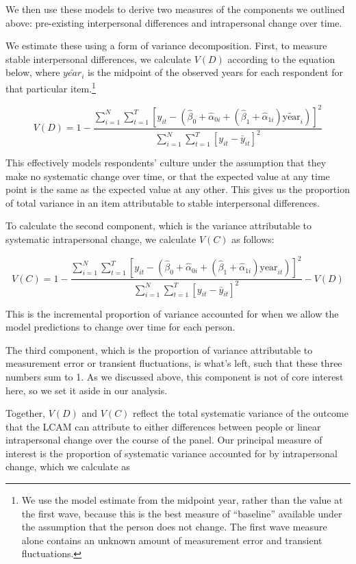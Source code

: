 \documentclass[
  11pt,
]{article}
\begin{document}
We then use these models to derive two measures of the components we
outlined above: pre-existing interpersonal differences and intrapersonal
change over time.

We estimate these using a form of variance decomposition. First, to
measure stable interpersonal differences, we calculate \(V(D)\)
according to the equation below, where \(\widetilde{year_i}\) is the
midpoint of the observed years for each respondent for that particular
item.\footnote{We use the model estimate from the midpoint year, rather
  than the value at the first wave, because this is the best measure of
  ``baseline'' available under the assumption that the person does not
  change. The first wave measure alone contains an unknown amount of
  measurement error and transient fluctuations.}

\[
V(D) = 1 - \frac{\sum_{i=1}^N \sum_{t=1}^T [y_{it} - (\hat{\beta}_0 + \hat{\alpha}_{0i} + (\hat{\beta}_1 + \hat{\alpha}_{1i}) \widetilde{\text{year}}_{i})]^2}{\sum_{i=1}^N \sum_{t=1}^T [y_{it} - \bar{y}_{it}]^2}
\]

This effectively models respondents' culture under the assumption that
they make no systematic change over time, or that the expected value at
any time point is the same as the expected value at any other. This
gives us the proportion of total variance in an item attributable to
stable interpersonal differences.

To calculate the second component, which is the variance attributable to
systematic intrapersonal change, we calculate \(V(C)\) as follows:

\[
V(C) = 1 - \frac{\sum_{i=1}^N \sum_{t=1}^T [y_{it} - (\hat{\beta}_0 + \hat{\alpha}_{0i} + (\hat{\beta}_1 + \hat{\alpha}_{1i}) \text{year}_{it})]^2}{\sum_{i=1}^N \sum_{t=1}^T [y_{it} - \bar{y}_{it}]^2} - V(D)
\]

This is the incremental proportion of variance accounted for when we
allow the model predictions to change over time for each person.

The third component, which is the proportion of variance attributable to
measurement error or transient fluctuations, is what's left, such that
these three numbers sum to 1. As we discussed above, this component is
not of core interest here, so we set it aside in our analysis.

Together, \(V(D)\) and \(V(C)\) reflect the total systematic variance of
the outcome that the LCAM can attribute to either differences between
people or linear intrapersonal change over the course of the panel. Our
principal measure of interest is the proportion of systematic variance
accounted for by intrapersonal change, which we calculate as
\end{document}
